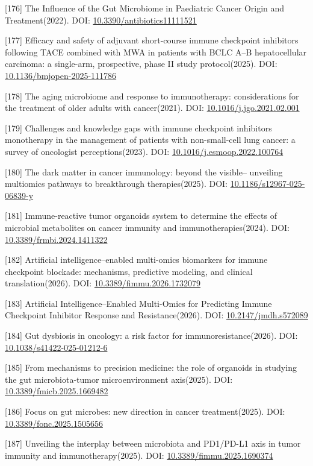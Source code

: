 {[}176{]} The Influence of the Gut Microbiome in Paediatric Cancer Origin and Treatment(2022). DOI: \url{10.3390/antibiotics11111521}

{[}177{]} Efficacy and safety of adjuvant short-course immune checkpoint inhibitors following TACE combined with MWA in patients with BCLC A--B hepatocellular carcinoma: a single-arm, prospective, phase II study protocol(2025). DOI: \url{10.1136/bmjopen-2025-111786}

{[}178{]} The aging microbiome and response to immunotherapy: considerations for the treatment of older adults with cancer(2021). DOI: \url{10.1016/j.jgo.2021.02.001}

{[}179{]} Challenges and knowledge gaps with immune checkpoint inhibitors monotherapy in the management of patients with non-small-cell lung cancer: a survey of oncologist perceptions(2023). DOI: \url{10.1016/j.esmoop.2022.100764}

{[}180{]} The dark matter in cancer immunology: beyond the visible-- unveiling multiomics pathways to breakthrough therapies(2025). DOI: \url{10.1186/s12967-025-06839-y}

{[}181{]} Immune-reactive tumor organoids system to determine the effects of microbial metabolites on cancer immunity and immunotherapies(2024). DOI: \url{10.3389/frmbi.2024.1411322}

{[}182{]} Artificial intelligence--enabled multi-omics biomarkers for immune checkpoint blockade: mechanisms, predictive modeling, and clinical translation(2026). DOI: \url{10.3389/fimmu.2026.1732079}

{[}183{]} Artificial Intelligence--Enabled Multi-Omics for Predicting Immune Checkpoint Inhibitor Response and Resistance(2026). DOI: \url{10.2147/jmdh.s572089}

{[}184{]} Gut dysbiosis in oncology: a risk factor for immunoresistance(2026). DOI: \url{10.1038/s41422-025-01212-6}

{[}185{]} From mechanisms to precision medicine: the role of organoids in studying the gut microbiota-tumor microenvironment axis(2025). DOI: \url{10.3389/fmicb.2025.1669482}

{[}186{]} Focus on gut microbes: new direction in cancer treatment(2025). DOI: \url{10.3389/fonc.2025.1505656}

{[}187{]} Unveiling the interplay between microbiota and PD1/PD-L1 axis in tumor immunity and immunotherapy(2025). DOI: \url{10.3389/fimmu.2025.1690374}
